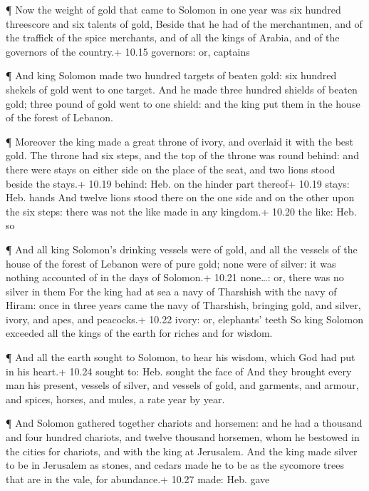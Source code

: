  ¶ Now the weight of gold that came to Solomon in one year
was six hundred threescore and six talents of gold,  Beside
that he had of the merchantmen, and of the traffick of the spice
merchants, and of all the kings of Arabia, and of the governors of the
country.+ 10.15 governors: or, captains

 ¶ And king Solomon made two hundred targets of beaten
gold: six hundred shekels of gold went to one target.  And
he made three hundred shields of beaten gold; three pound of gold went
to one shield: and the king put them in the house of the forest of
Lebanon.

 ¶ Moreover the king made a great throne of ivory, and
overlaid it with the best gold.  The throne had six steps,
and the top of the throne was round behind: and there were stays on
either side on the place of the seat, and two lions stood beside the
stays.+ 10.19 behind: Heb. on the hinder part thereof+ 10.19 stays: Heb.
hands  And twelve lions stood there on the one side and on
the other upon the six steps: there was not the like made in any
kingdom.+ 10.20 the like: Heb. so

 ¶ And all king Solomon's drinking vessels were of gold,
and all the vessels of the house of the forest of Lebanon were of pure
gold; none were of silver: it was nothing accounted of in the days of
Solomon.+ 10.21 none\ldots: or, there was no silver in them
 For the king had at sea a navy of Tharshish with the navy
of Hiram: once in three years came the navy of Tharshish, bringing gold,
and silver, ivory, and apes, and peacocks.+ 10.22 ivory: or, elephants'
teeth  So king Solomon exceeded all the kings of the earth
for riches and for wisdom.

 ¶ And all the earth sought to Solomon, to hear his wisdom,
which God had put in his heart.+ 10.24 sought to: Heb. sought the face
of  And they brought every man his present, vessels of
silver, and vessels of gold, and garments, and armour, and spices,
horses, and mules, a rate year by year.

 ¶ And Solomon gathered together chariots and horsemen: and
he had a thousand and four hundred chariots, and twelve thousand
horsemen, whom he bestowed in the cities for chariots, and with the king
at Jerusalem.  And the king made silver to be in Jerusalem
as stones, and cedars made he to be as the sycomore trees that are in
the vale, for abundance.+ 10.27 made: Heb. gave

